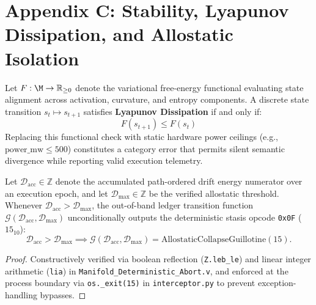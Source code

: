 \section*{Appendix C: Stability, Lyapunov Dissipation, and Allostatic Isolation}
\label{app:stability}

\begin{definition}
Let $F : \M \to \mathbb{R}_{\ge 0}$ denote the variational free-energy functional evaluating state alignment across activation, curvature, and entropy components. A discrete state transition $s_t \mapsto s_{t+1}$ satisfies \textbf{Lyapunov Dissipation} if and only if:
\begin{equation}
  F(s_{t+1}) \le F(s_t)
\end{equation}
Replacing this functional check with static hardware power ceilings (e.g., $\text{power\_mw} \le 500$) constitutes a category error that permits silent semantic divergence while reporting valid execution telemetry.
\end{definition}

\begin{theorem}
Let $\mathcal{D}_{\mathrm{acc}} \in \mathbb{Z}$ denote the accumulated path-ordered drift energy numerator over an execution epoch, and let $\mathcal{D}_{\max} \in \mathbb{Z}$ be the verified allostatic threshold. Whenever $\mathcal{D}_{\mathrm{acc}} > \mathcal{D}_{\max}$, the out-of-band ledger transition function $\mathcal{G}(\mathcal{D}_{\mathrm{acc}}, \mathcal{D}_{\max})$ unconditionally outputs the deterministic stasis opcode \texttt{0x0F} ($15_{10}$):
\begin{equation}
  \mathcal{D}_{\mathrm{acc}} > \mathcal{D}_{\max} \implies \mathcal{G}(\mathcal{D}_{\mathrm{acc}}, \mathcal{D}_{\max}) = \mathrm{AllostaticCollapseGuillotine}(15).
\end{equation}
\end{theorem}

\begin{proof}
Constructively verified via boolean reflection (\texttt{Z.leb\_le}) and linear integer arithmetic (\texttt{lia}) in \texttt{Manifold\_Deterministic\_Abort.v}, and enforced at the process boundary via \texttt{os.\_exit(15)} in \texttt{interceptor.py} to prevent exception-handling bypasses.
\end{proof}
